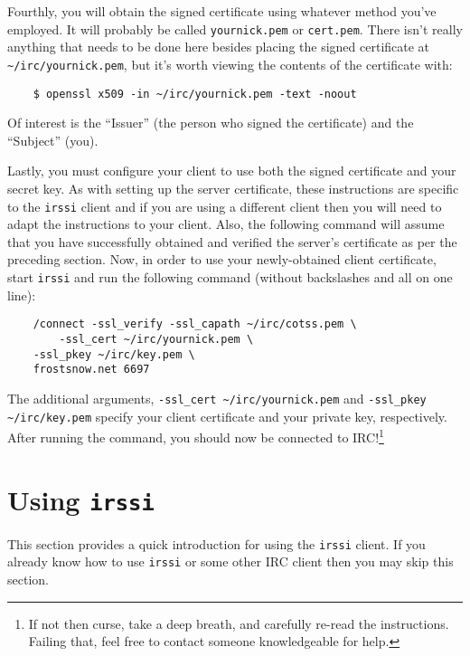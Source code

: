 \documentclass{article}
\begin{document}
{Fourthly, you will obtain the signed certificate using whatever method you've employed.  It will probably be called \texttt{yournick.pem} or \texttt{cert.pem}.  There isn't really anything that needs to be done here besides placing the signed certificate at \texttt{\textasciitilde/irc/yournick.pem}, but it's worth viewing the contents of the certificate with:
\begin{lstlisting}
    $ openssl x509 -in ~/irc/yournick.pem -text -noout
\end{lstlisting}
Of interest is the ``Issuer'' (the person who signed the certificate) and the ``Subject'' (you).

Lastly, you must configure your client to use both the signed certificate and your secret key.  As with setting up the server certificate, these instructions are specific to the \texttt{irssi} client and if you are using a different client then you will need to adapt the instructions to your client.  Also, the following command will assume that you have successfully obtained and verified the server's certificate as per the preceding section.  Now, in order to use your newly-obtained client certificate, start \texttt{irssi} and run the following command (without backslashes and all on one line):
\begin{lstlisting}
    /connect -ssl_verify -ssl_capath ~/irc/cotss.pem \
        -ssl_cert ~/irc/yournick.pem \
	-ssl_pkey ~/irc/key.pem \
	frostsnow.net 6697
\end{lstlisting}
The additional arguments, \texttt{-ssl\_cert \textasciitilde/irc/yournick.pem} and \texttt{-ssl\_pkey \textasciitilde/irc/key.pem} specify your client certificate and your private key, respectively.  After running the command, you should now be connected to IRC!\footnote{If not then curse, take a deep breath, and carefully re-read the instructions.  Failing that, feel free to contact someone knowledgeable for help.}

\section{Using \texttt{irssi}}
This section provides a quick introduction for using the \texttt{irssi} client.  If you already know how to use \texttt{irssi} or some other IRC client then you may skip this section.

}
\end{document}
